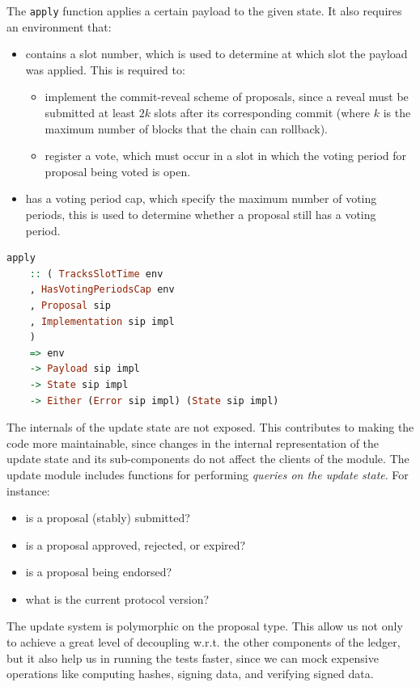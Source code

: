 The \lstinline[language=Haskell]!apply! function applies a certain payload to
the given state. It
also requires an environment that:
\begin{itemize}
	\item contains a slot number, which is used to determine at which slot the
	payload was applied. This is required to:
	\begin{itemize}
		\item implement the commit-reveal scheme of proposals, since a reveal
		must be
		submitted at least $2k$ slots after its corresponding commit (where $k$
		is
		the maximum number of blocks that the chain can rollback).
		\item register a vote, which must occur in a slot in which the voting
		period
		for proposal being voted is open.
	\end{itemize}
	\item has a voting period cap, which specify the maximum number of voting
	periods, this is used to determine whether a proposal still has a voting
	period.
\end{itemize}

\begin{lstlisting}[language=Haskell]
	apply
	:: ( TracksSlotTime env
	, HasVotingPeriodsCap env
	, Proposal sip
	, Implementation sip impl
	)
	=> env
	-> Payload sip impl
	-> State sip impl
	-> Either (Error sip impl) (State sip impl)
\end{lstlisting}

The internals of the update state are not exposed. This contributes to making
the code more maintainable, since changes in the internal representation of the
update state and its sub-components do not affect the clients of the module.
The update module includes functions for performing \emph{queries on the update
	state}. For instance:
\begin{itemize}
	\item is a proposal (stably) submitted?
	\item is a proposal approved, rejected, or expired?
	\item is a proposal being endorsed?
	\item what is the current protocol version?
\end{itemize}

The update system is polymorphic on the proposal type. This allow us not only
to achieve a great level of decoupling w.r.t. the other components of the
ledger, but it also help us in running the tests faster, since we can mock
expensive operations like computing hashes, signing data, and verifying signed
data.

